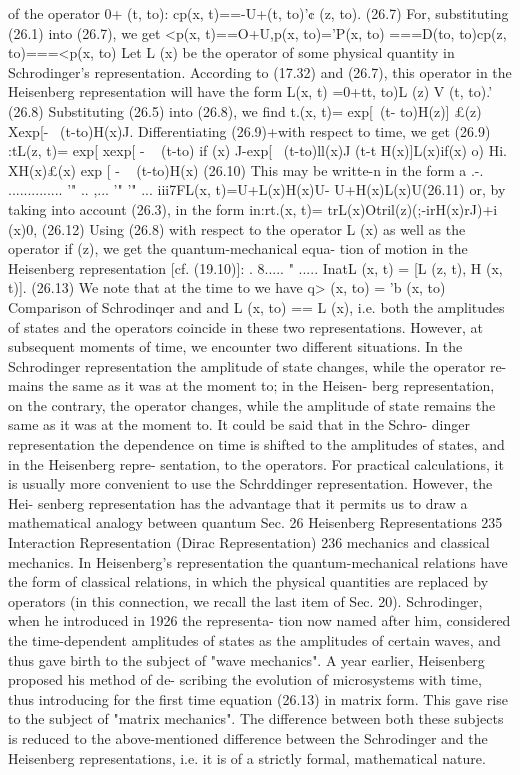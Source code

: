 \documentclass[a4paper,sfsidenotes,colorlinks=true]{tufte-book}
\numberwithin{equation}{section}
\numberwithin{figure}{section}
\begin{document}
{{{{{{of the operator 0+ (t, to): cp(x, t)==-U+(t, to)'¢ (z, to).	(26.7) For, substituting (26.1) into (26.7), we get
<p(x, t)==O+U,p(x, to)='P(x, to) ===D(to, to)cp(z, to)===<p(x, to)
Let L (x) be the operator of some physical quantity in Schrodinger's representation. According to (17.32) and (26.7), this operator in the Heisenberg representation will have the form
L(x, t) =0+tt, to)L (z) V (t, to).'	(26.8)
Substituting (26.5) into (26.8), we find t.(x, t)= exp[~(t- to)H(z)] £(z)
Xexp[- ~(t-to)H(x)J. Differentiating (26.9)+with respect to time, we get
(26.9)
:tL(z, t)= exp[ xexp[ -	~ (t-to) if (x)	J-exp[~ (t-to)ll(x)J
(t-t H(x)]L(x)if(x) o)
Hi.
XH(x)£(x) exp [ - ~ (t-to)H(x)}	(26.10) This may be writte-n in the form
a	.-.	..............	'"	..	,...	'"	'"	... iii7FL(x, t)=U+L(x)H(x)U- U+H(x)L(x)U(26.11)
or, by taking into account (26.3), in the form
in:rt.(x, t)= trL(x)Otril(z)(;-irH(x)rJ{)+i (x)0,
(26.12)
Using (26.8) with respect to the operator L (x) as well as
the operator if (z), we get the quantum-mechanical equa- tion of motion in the Heisenberg representation [cf. (19.10)]:
.	8.....	"	..... InatL (x, t) = [L (z, t), H (x, t)].	(26.13)
We note that at the time to we have q> (x, to) = 'b (x, to) Comparison of Schrodinqer and
and L (x, to) == L (x), i.e. both the amplitudes of states and the operators coincide in these two representations.
However, at subsequent moments of time, we encounter two different situations. In the Schrodinger representation the amplitude of state changes, while the operator re- mains the same as it was at the moment to; in the Heisen- berg representation, on the contrary, the operator changes, while the amplitude of state remains the same as it was at the moment to. It could be said that in the Schro- dinger representation the dependence on time is shifted to the amplitudes of states, and in the Heisenberg repre- sentation, to the operators.
For practical calculations, it is usually more convenient to use the Schrddinger representation. However, the Hei- senberg representation has the advantage that it permits us to draw a mathematical analogy between quantum
Sec. 26
Heisenberg Representations
235
Interaction Representation (Dirac Representation)
236
mechanics and classical mechanics. In Heisenberg's representation the quantum-mechanical relations have the form of classical relations, in which the physical quantities are replaced by operators (in this connection, we recall the last item of Sec. 20).
Schrodinger, when he introduced in 1926 the representa- tion now named after him, considered the time-dependent amplitudes of states as the amplitudes of certain waves, and thus gave birth to the subject of "wave mechanics". A year earlier, Heisenberg proposed his method of de- scribing the evolution of microsystems with time, thus introducing for the first time equation (26.13) in matrix form. This gave rise to the subject of "matrix mechanics". The difference between both these subjects is reduced to the above-mentioned difference between the Schrodinger and the Heisenberg representations, i.e. it is of a strictly formal, mathematical nature.
}}}}}}
\end{document}
